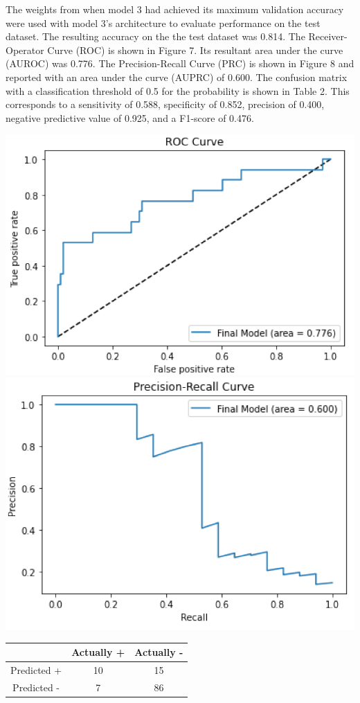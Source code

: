 \documentclass[10pt]{article}
\begin{document}
\begin{multicols}{2}
The weights from when model 3 had achieved its maximum validation accuracy were used with model 3's architecture to evaluate performance on the test dataset. The resulting accuracy on the the test dataset was 0.814. The Receiver-Operator Curve (ROC) is shown in Figure 7. Its resultant area under the curve (AUROC) was 0.776. The Precision-Recall Curve (PRC) is shown in Figure 8 and reported with an area under the curve (AUPRC) of 0.600. The confusion matrix with a classification threshold of 0.5 for the probability is shown in Table 2. This corresponds to a sensitivity of 0.588, specificity of 0.852, precision of 0.400, negative predictive value of 0.925, and a F1-score of 0.476.

\begin{center}
\includegraphics[width=.4\textwidth]{ROC}
\includegraphics[width=.4\textwidth]{PRC}
\end{center}

\begin{center}
\begin{tabular}{ |c||c|c|  }
 \hline
 & Actually + & Actually -\\
 \hline
 Predicted + & 10 & 15\\
 Predicted - & 7 & 86\\
 \hline
\end{tabular}
\end{center}


\end{multicols}
\end{document}
